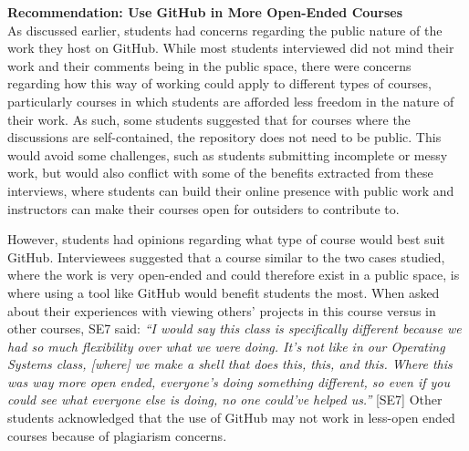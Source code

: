 \textbf{Recommendation: Use GitHub in More Open-Ended Courses} \\
As discussed earlier, students had concerns regarding the public nature of the work they host on GitHub. While most students interviewed did not mind their work and their comments being in the public space, there were concerns regarding how this way of working could apply to different types of courses, particularly courses in which students are afforded less freedom in the nature of their work. As such, some students suggested that for courses where the discussions are self-contained, the repository does not need to be public. This would avoid some challenges, such as students submitting incomplete or messy work, but would also conflict with some of the benefits extracted from these interviews, where students can build their online presence with public work and instructors can make their courses open for outsiders to contribute to.



However, students had opinions regarding what type of course would best suit GitHub. Interviewees suggested that a course similar to the two cases studied, where the work is very open-ended and could therefore exist in a public space, is where using a tool like GitHub would benefit students the most. When asked about their experiences with viewing others' projects in this course versus in other courses, SE7 said: \textit{``I would say this class is specifically different because we had so much flexibility over what we were doing. It's not like in our Operating Systems class, [where] we make a shell that does this, this, and this. Where this was way more open ended, everyone's doing something different, so even if you could see what everyone else is doing, no one could've helped us.''} [SE7] Other students acknowledged that the use of GitHub may not work in less-open ended courses because of plagiarism concerns.

